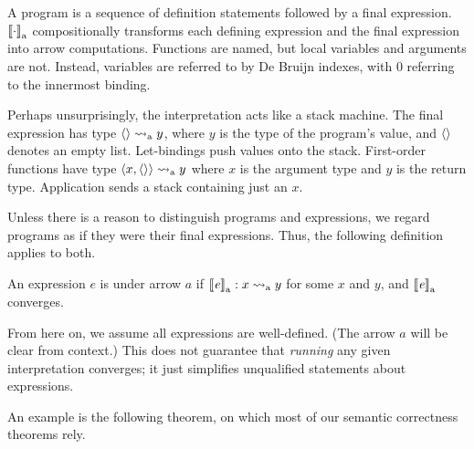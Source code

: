 \documentclass[preprint]{sigplanconf}
\newcommand{\arrow}{\rightsquigarrow}
\newcommand{\gen}{_\mathrm{a}}
\begin{document}
A program is a sequence of definition statements followed by a final expression.
$\meaningof{\cdot}\gen$ compositionally transforms each defining expression and the final expression into arrow computations.
Functions are named, but local variables and arguments are not.
Instead, variables are referred to by De Bruijn indexes, with $0$ referring to the innermost binding.

Perhaps unsurprisingly, the interpretation acts like a stack machine.
The final expression has type $\pair{} \arrow\gen y$, where $y$ is the type of the program's value, and $\langle{}\rangle$ denotes an empty list.
Let-bindings push values onto the stack.
First-order functions have type $\pair{x,\pair{}} \arrow\gen y$ where $x$ is the argument type and $y$ is the return type.
Application sends a stack containing just an $x$.

Unless there is a reason to distinguish programs and expressions, we regard programs as if they were their final expressions.
Thus, the following definition applies to both.

\begin{definition}
An expression $\mathit{e}$ is  under arrow $a$ if $\meaningof{\mathit{e}}\gen : x \arrow\gen y$ for some $x$ and $y$, and $\meaningof{\mathit{e}}\gen$ converges.
\label{def:well-defined-expression}
\end{definition}

From here on, we assume all expressions are well-defined.
(The arrow $a$ will be clear from context.)
This does not guarantee that \emph{running} any given interpretation converges; it just simplifies unqualified statements about expressions.

An example is the following theorem, on which most of our semantic correctness theorems rely.
\end{document}
